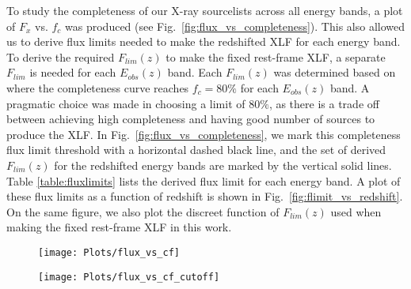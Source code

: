 \documentclass[fleqn,usenatbib]{mnras}
\begin{document}
    
    To study the completeness of our X-ray sourcelists across all energy bands, a plot of $F_{x}$ vs. $f_{c}$ was produced (see Fig.~\ref{fig:flux_vs_completeness}).
    This also allowed us to derive flux limits needed to make the redshifted XLF for each energy band.
    To derive the required $F_{lim}(z)$ to make the fixed rest-frame XLF, a separate $F_{lim}$ is needed for each $E_{obs}(z)$ band.
    Each $F_{lim}(z)$ was determined based on where the completeness curve reaches $f_{c} = 80\%$ for each $E_{obs}(z)$ band.
    A pragmatic choice was made in choosing a limit of $80\%$, as there is a trade off between achieving high completeness and having good number of sources to produce the XLF. 
    In Fig.~\ref{fig:flux_vs_completeness}, we mark this completeness flux limit threshold with a horizontal dashed black line, and the set of derived $F_{lim}(z)$ for the redshifted energy bands are marked by the vertical solid lines.
    Table \ref{table:fluxlimits} lists the derived flux limit for each energy band.
    A plot of these flux limits as a function of redshift is shown in Fig.~\ref{fig:flimit_vs_redshift}.
    On the same figure, we also plot the discreet function of $F_{lim}(z)$ used when making the fixed rest-frame XLF in this work.

        
		\begin{figure*}
		\centering
			\begin{subfigure}{0.5\textwidth}
			\texttt{[image: Plots/flux\_vs\_cf]}
 			\label{fig:flux_vs_cf}
			\end{subfigure}%
			\begin{subfigure}{0.5\textwidth}
  			\texttt{[image: Plots/flux\_vs\_cf\_cutoff]}
 			\label{fig:flux_vs_cf_cutoff}
		    \end{subfigure}%
		\caption{Plot of flux $F$ vs. the completeness fraction $f_{c}$ for each energy band. The purple data points mark the $E_{rf}$ band, and the rest of the colors mark the $E_{obs}(z)$ bands. \textit{Right:} Completeness plot displaying the completeness flux limit threshold at $f_{c} = 80\%$, marked by the horizontal black dashed line. The flux limits for each $E(z)$ band are also plotted as vertical solid lines, with the same color corresponding to their data points. \textit{Left:} For clarity, we show the same plot without the threshold and flux limit lines.}
		\label{fig:flux_vs_completeness}
		\end{figure*}
        
\end{document}
